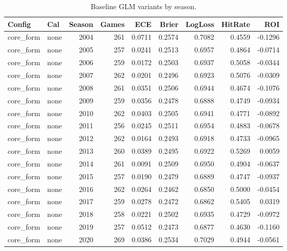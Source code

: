 \begin{table}[t]
  \centering
  \footnotesize
  \caption[GLM variants (harness)]{Baseline GLM variants by season.}
  \label{tab:glm-harness}
  \setlength{\tabcolsep}{3pt}\renewcommand{\arraystretch}{1.1}
  \begin{tabular}{@{} l l r r r r r r r @{} }
    \toprule
    Config & Cal & Season & Games & ECE & Brier & LogLoss & HitRate & ROI \\ 
    \midrule
      core\_form & none & 2004 & 261 & 0.0711 & 0.2574 & 0.7082 & 0.4559 & -0.1296 \\
      core\_form & none & 2005 & 257 & 0.0241 & 0.2513 & 0.6957 & 0.4864 & -0.0714 \\
      core\_form & none & 2006 & 259 & 0.0172 & 0.2503 & 0.6937 & 0.5058 & -0.0344 \\
      core\_form & none & 2007 & 262 & 0.0201 & 0.2496 & 0.6923 & 0.5076 & -0.0309 \\
      core\_form & none & 2008 & 261 & 0.0351 & 0.2506 & 0.6944 & 0.4674 & -0.1076 \\
      core\_form & none & 2009 & 259 & 0.0356 & 0.2478 & 0.6888 & 0.4749 & -0.0934 \\
      core\_form & none & 2010 & 262 & 0.0403 & 0.2505 & 0.6941 & 0.4771 & -0.0892 \\
      core\_form & none & 2011 & 256 & 0.0245 & 0.2511 & 0.6954 & 0.4883 & -0.0678 \\
      core\_form & none & 2012 & 262 & 0.0164 & 0.2493 & 0.6918 & 0.4733 & -0.0965 \\
      core\_form & none & 2013 & 260 & 0.0389 & 0.2495 & 0.6922 & 0.5269 & 0.0059 \\
      core\_form & none & 2014 & 261 & 0.0091 & 0.2509 & 0.6950 & 0.4904 & -0.0637 \\
      core\_form & none & 2015 & 257 & 0.0190 & 0.2479 & 0.6889 & 0.4747 & -0.0937 \\
      core\_form & none & 2016 & 262 & 0.0264 & 0.2462 & 0.6850 & 0.5000 & -0.0454 \\
      core\_form & none & 2017 & 259 & 0.0278 & 0.2472 & 0.6862 & 0.5405 & 0.0319 \\
      core\_form & none & 2018 & 258 & 0.0221 & 0.2502 & 0.6935 & 0.4729 & -0.0972 \\
      core\_form & none & 2019 & 257 & 0.0512 & 0.2473 & 0.6877 & 0.4630 & -0.1160 \\
      core\_form & none & 2020 & 269 & 0.0386 & 0.2534 & 0.7029 & 0.4944 & -0.0561 \\

\end{tabular}
\end{table}
